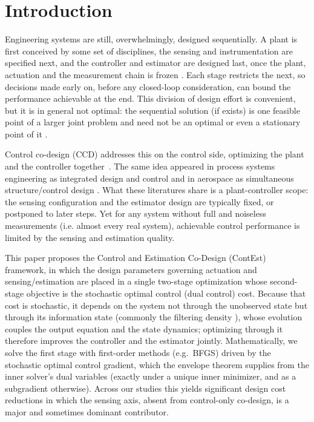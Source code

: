 \documentclass[twocolumn,amsthm]{autart}
\begin{document}
\section{Introduction}\label{sec:intro}

Engineering systems are still, overwhelmingly, designed sequentially. A
plant is first conceived by some set of disciplines, the sensing and
instrumentation are specified next, and the controller and estimator are
designed last, once the plant, actuation and the measurement chain is frozen
\cite{garcia2019control}. Each stage restricts the next, so decisions made
early on, before any closed-loop consideration, can bound the performance
achievable at the end. This division of design effort is convenient, but
it is in general not optimal: the sequential solution (if exists) is one feasible
point of a larger joint problem and need not be an optimal or even a stationary point of it \cite{fathy2001coupling}.

Control co-design (CCD) addresses this on the control side, optimizing the
plant and the controller together~\cite{garcia2019control,allison2014multidisciplinary}. The same idea appeared in
process systems engineering as integrated design and control \cite{sakizlis2004recent,sharifzadeh2013integration} and in aerospace as
simultaneous structure/control design \cite{onoda1987approach,hale1985optimal}. What these literatures share is a
plant-controller scope: the sensing configuration and the estimator design are
typically fixed, or postponed to later steps. Yet for any
system without full and noiseless measurements (i.e. almost every real
system), achievable control performance is limited by the sensing and estimation quality.

This paper proposes the Control and Estimation Co-Design (ContEst) framework, in which the design parameters governing actuation and sensing/estimation are placed in a single two-stage optimization whose second-stage objective is the stochastic optimal control (dual control) cost. Because that cost is
stochastic, it depends on the system not through the unobserved state but through its information state (commonly the filtering density
\cite{kumar2015stochastic}), whose evolution couples the output
equation and the state dynamics; optimizing through it therefore improves the controller and the estimator jointly. Mathematically, we solve the first stage with first-order methods (e.g.\ BFGS) driven by the stochastic optimal control gradient, which the envelope theorem supplies from the inner solver's dual variables (exactly under a unique inner minimizer, and as a subgradient otherwise). Across our studies this yields significant design cost reductions in which the sensing axis, absent from control-only co-design, is a major and sometimes dominant contributor.
\end{document}
